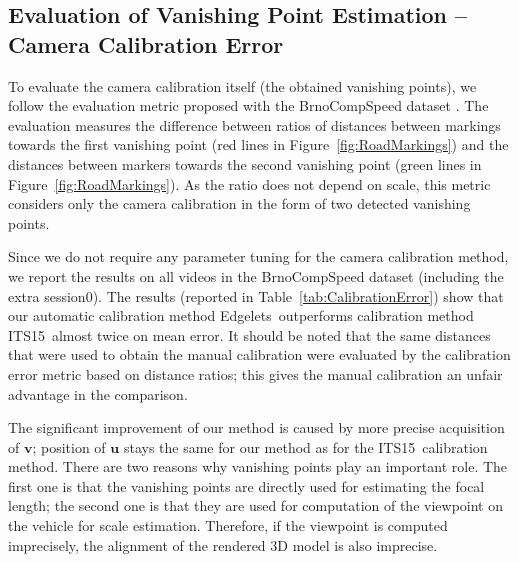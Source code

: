 \documentclass[]{elsarticle}
\newcommand{\ITSCalib}{ITS15}
\newcommand{\EdgeLetsCalib}{Edgelets}
\begin{document}
\subsection{Evaluation of Vanishing Point Estimation -- Camera Calibration Error} \label{sec:CameraCalibEvaluation}
To evaluate the camera calibration itself (the obtained vanishing points), we follow the evaluation metric proposed with the BrnoCompSpeed dataset \citep{BrnoCompSpeed}. The evaluation measures the difference between ratios of distances between markings towards the first vanishing point (red lines in Figure~\ref{fig:RoadMarkings}) and the distances between markers towards the second vanishing point (green lines in Figure~\ref{fig:RoadMarkings}). As the ratio does not depend on scale, this metric considers only the camera calibration in the form of two detected vanishing points. 

Since we do not require any parameter tuning for the camera calibration method, we report the results on all videos in the BrnoCompSpeed dataset (including the extra session0).
The results (reported in Table~\ref{tab:CalibrationError}) show that our automatic calibration method \EdgeLetsCalib\ outperforms calibration method \ITSCalib\ almost twice on mean error. 
It should be noted that the same distances that were used to obtain the manual calibration were evaluated by the calibration error metric based on distance ratios; this gives the manual calibration an unfair advantage in the comparison.

The significant improvement of our method is caused by more precise acquisition of $\mathbf{v}$; position of $\mathbf{u}$ stays the same for our method as for the \ITSCalib\ calibration method. 
There are two reasons why vanishing points play an important role. The first one is that the vanishing points are directly used for estimating the focal length; the second one is that they are used for computation of the viewpoint on the vehicle for scale estimation. Therefore, if the viewpoint is computed imprecisely, the alignment of the rendered 3D model is also imprecise.
\end{document}
